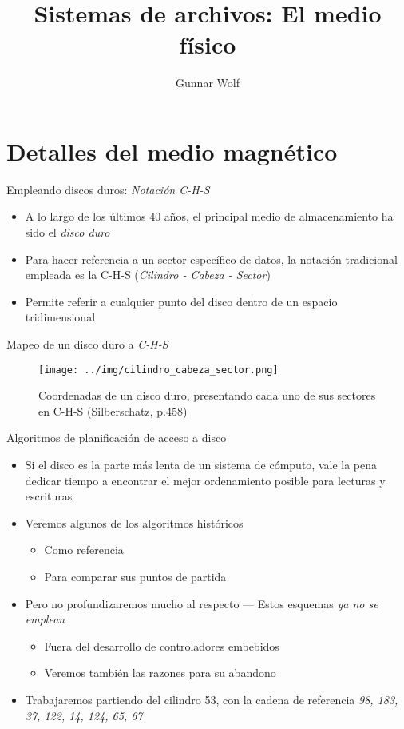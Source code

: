 \documentclass[presentation]{beamer}
\author{Gunnar Wolf}
\date{}
\title{Sistemas de archivos: El medio físico}
\begin{document}
\maketitle

\section{Detalles del medio magnético}
\label{sec:orga3da7bc}

\begin{frame}[label={sec:org9511360}]{Empleando discos duros: \emph{Notación C-H-S}}
\begin{itemize}
\item A lo largo de los últimos 40 años, el principal medio de
almacenamiento ha sido el \emph{disco duro}
\item Para hacer referencia a un sector específico de datos, la notación
tradicional empleada es la C-H-S (\emph{Cilindro - Cabeza - Sector})
\item Permite referir a cualquier punto del disco dentro de un espacio
tridimensional
\end{itemize}
\end{frame}

\begin{frame}[label={sec:org7909de6}]{Mapeo de un disco duro a \emph{C-H-S}}
\begin{figure}[htbp]
\centering
\texttt{[image: ../img/cilindro\_cabeza\_sector.png]}
\caption{Coordenadas de un disco duro, presentando cada uno de sus sectores en C-H-S (Silberschatz, p.458)}
\end{figure}
\end{frame}

\begin{frame}[label={sec:org972de4c}]{Algoritmos de planificación de acceso a disco}
\begin{itemize}
\item Si el disco es la parte más lenta de un sistema de cómputo, vale la
pena dedicar tiempo a encontrar el mejor ordenamiento posible para
lecturas y escrituras
\item Veremos algunos de los algoritmos históricos
\begin{itemize}
\item Como referencia
\item Para comparar sus puntos de partida
\end{itemize}
\item Pero no profundizaremos mucho al respecto — Estos esquemas \emph{ya no se emplean}
\begin{itemize}
\item Fuera del desarrollo de controladores embebidos
\item Veremos también las razones para su abandono
\end{itemize}
\item Trabajaremos partiendo del cilindro 53, con la cadena de referencia
\emph{98, 183, 37, 122, 14, 124, 65, 67}
\end{itemize}
\end{frame}
\end{document}
